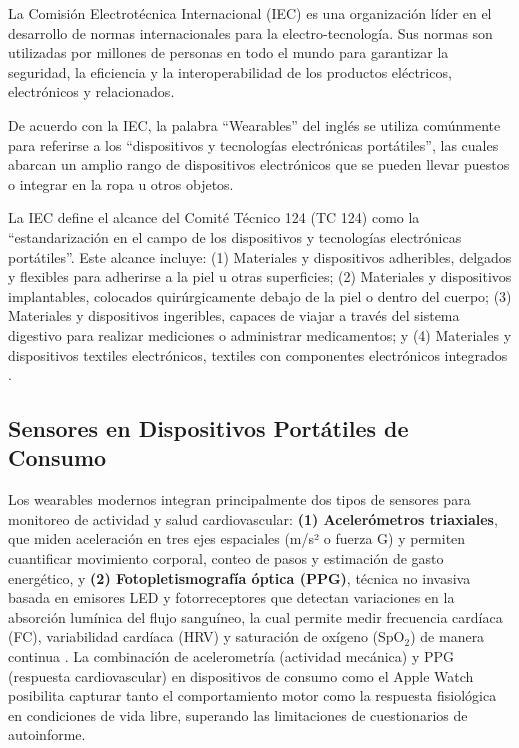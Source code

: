 La Comisión Electrotécnica Internacional (IEC) es una organización líder en el desarrollo de normas internacionales para la electro-tecnología. Sus normas son utilizadas por millones de personas en todo el mundo para garantizar la seguridad, la eficiencia y la interoperabilidad de los productos eléctricos, electrónicos y relacionados.

De acuerdo con la IEC, la palabra ``Wearables'' del inglés se utiliza comúnmente para referirse a los ``dispositivos y tecnologías electrónicas portátiles'', las cuales abarcan un amplio rango de dispositivos electrónicos que se pueden llevar puestos o integrar en la ropa u otros objetos.

La IEC define el alcance del Comité Técnico 124 (TC 124) como la ``estandarización en el campo de los dispositivos y tecnologías electrónicas portátiles''. Este alcance incluye: (1) Materiales y dispositivos adheribles, delgados y flexibles para adherirse a la piel u otras superficies; (2) Materiales y dispositivos implantables, colocados quirúrgicamente debajo de la piel o dentro del cuerpo; (3) Materiales y dispositivos ingeribles, capaces de viajar a través del sistema digestivo para realizar mediciones o administrar medicamentos; y (4) Materiales y dispositivos textiles electrónicos, textiles con componentes electrónicos integrados \citep{IEC2019Wearables}.

\subsection{Sensores en Dispositivos Portátiles de Consumo}
\label{subsec:sensores}

Los wearables modernos integran principalmente dos tipos de sensores para monitoreo de actividad y salud cardiovascular: \textbf{(1) Acelerómetros triaxiales}, que miden aceleración en tres ejes espaciales (m/s² o fuerza G) y permiten cuantificar movimiento corporal, conteo de pasos y estimación de gasto energético, y \textbf{(2) Fotopletismografía óptica (PPG)}, técnica no invasiva basada en emisores LED y fotorreceptores que detectan variaciones en la absorción lumínica del flujo sanguíneo, la cual permite medir frecuencia cardíaca (FC), variabilidad cardíaca (HRV) y saturación de oxígeno (SpO$_2$) de manera continua \citep{Bent2020,Shcherbina2017,Henriksen2018,White2019}. La combinación de acelerometría (actividad mecánica) y PPG (respuesta cardiovascular) en dispositivos de consumo como el Apple Watch posibilita capturar tanto el comportamiento motor como la respuesta fisiológica en condiciones de vida libre, superando las limitaciones de cuestionarios de autoinforme.


